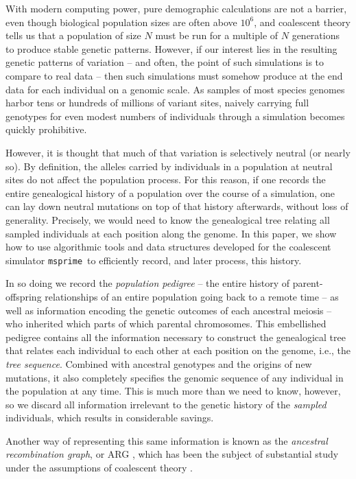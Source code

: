 \documentclass{article}
\newcommand{\msprime}{\texttt{msprime}}
\begin{document}
With modern computing power, pure demographic calculations are not a barrier,
even though biological population sizes are often above $10^6$,
and coalescent theory tells us that a population of size $N$
must be run for a multiple of $N$ generations to produce stable genetic patterns.
However, if our interest lies in the resulting genetic patterns of variation
-- and often, the point of such simulations is to compare to real data --
then such simulations must somehow produce at the end data for each individual on a genomic scale.
As samples of most species genomes harbor tens or hundreds of millions of variant sites,
naively carrying full genotypes for even modest numbers of individuals through a simulation becomes quickly prohibitive.

However, it is thought that much of that variation is selectively neutral (or nearly so).
By definition, the alleles carried by individuals in a population at neutral sites
do not affect the population process.
For this reason, if one records the entire genealogical history of a population over the course of a simulation,
one can lay down neutral mutations on top of that history afterwards,
without loss of generality.
Precisely, we would need to know the genealogical tree relating all sampled individuals
at each position along the genome.
In this paper, we show how to use algorithmic tools and data structures developed for the coalescent simulator \msprime\
to efficiently record, and later process, this history.

In so doing we record the \emph{population pedigree} --
the entire history of parent-offspring relationships of an entire population going back to a remote time --
as well as information encoding the genetic outcomes of each ancestral meiosis --
who inherited which parts of which parental chromosomes.
This embellished pedigree contains all the information necessary
to construct the genealogical tree that relates each individual to each other
at each position on the genome, i.e., the \emph{tree sequence}.
Combined with ancestral genotypes and the origins of new mutations,
it also completely specifies the genomic sequence of any individual in the population at any time.
This is much more than we need to know, however,
so we discard all information irrelevant to the genetic history
of the \emph{sampled} individuals,
which results in considerable savings.

Another way of representing this same information
is known as the \emph{ancestral recombination graph}, or {ARG} \citep{griffiths1997ancestral},
which has been the subject of substantial study
under the assumptions of coalescent theory \citep{wiuf1997number,wiuf1999ancestry,marjoram2006coalescent,wilton2015smc}.
\end{document}
